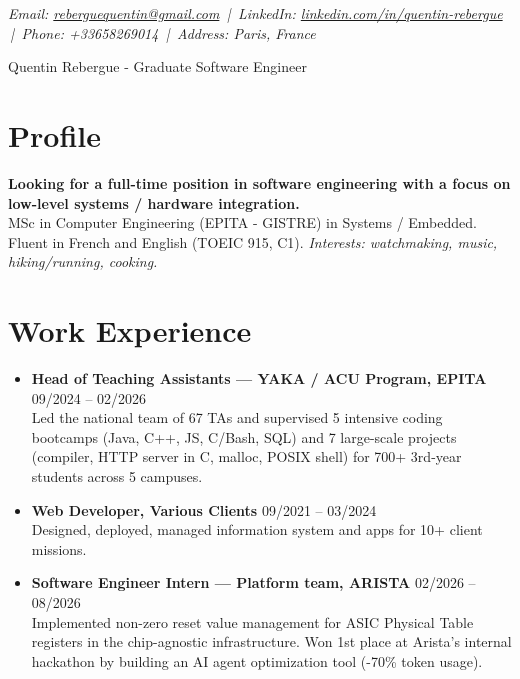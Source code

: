 \documentclass[9pt,a4paper]{article}
\newcommand{\namefont}{\fontsize{20}{22}\selectfont}
\newcommand{\tinyscript}{\fontsize{8}{9}\selectfont}
\begin{document}
\renewcommand\normalsize{\fontsize{10.5}{15}\selectfont}
\normalsize

\begin{center}
  {\tinyscript\itshape
  Email: \href{mailto:reberguequentin@gmail.com}{reberguequentin@gmail.com} \,|\,
  LinkedIn: \href{https://linkedin.com/in/quentin-rebergue}{linkedin.com/in/quentin-rebergue} \,|\,
  Phone: +33658269014 \,|\,
  Address: Paris, France}
\end{center}

\begin{center}
  {\namefont Quentin Rebergue - Graduate Software Engineer}
\end{center}

\section*{Profile}
\begin{tcolorbox}[mybox2]
\textbf{Looking for a full-time position in software engineering with a focus on low-level systems / hardware integration.}\\[0.3em] MSc in Computer Engineering (EPITA - GISTRE) in Systems / Embedded.\\[0.3em]
Fluent in French and English (TOEIC 915, C1). \textit{Interests: watchmaking, music, hiking/running, cooking.}
\end{tcolorbox}

\section*{Work Experience}
\begin{tcolorbox}[mybox]
\begin{itemize}
\item\textbf{Head of Teaching Assistants — YAKA / ACU Program, EPITA} \hfill {\small09/2024 – 02/2026}\\[0.5em]
\textcolor{gray!40!black}{Led the national team of 67 TAs and supervised 5 intensive coding bootcamps (Java, C++, JS, C/Bash, SQL) and 7 large-scale projects (compiler, HTTP server in C, malloc, POSIX shell) for 700+ 3rd-year students across 5 campuses.}

\item\textbf{Web Developer, Various Clients} \hfill {\small09/2021 – 03/2024}\\[0.5em]
\textcolor{gray!40!black}{Designed, deployed, managed information system and apps for 10+ client missions.}

\item\textbf{Software Engineer Intern — Platform team, ARISTA} \hfill {\small02/2026 – 08/2026}\\[0.5em]
\textcolor{gray!40!black}{Implemented non-zero reset value management for ASIC Physical Table registers in the chip-agnostic infrastructure. Won 1st place at Arista's internal hackathon by building an AI agent optimization tool (-70\% token usage).}
\end{itemize}
\end{tcolorbox}
\end{document}
